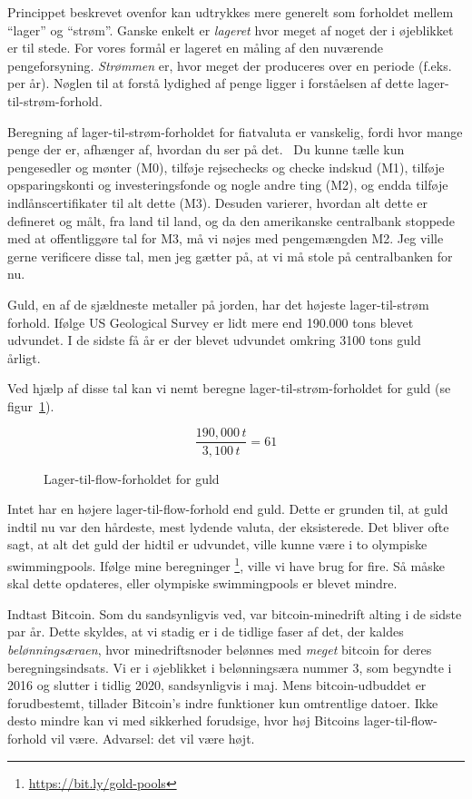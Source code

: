 Princippet beskrevet ovenfor kan udtrykkes mere generelt som
forholdet mellem \enquote{lager} og \enquote{strøm}. Ganske enkelt er 
\textit{lageret} hvor meget af noget der i øjeblikket er til stede. For vores 
formål er lageret en måling af den nuværende pengeforsyning. \textit{Strømmen} 
er, hvor meget der produceres over en periode (f.eks. per år). Nøglen til at 
forstå lydighed af penge ligger i forståelsen af dette lager-til-strøm-forhold.

Beregning af lager-til-strøm-forholdet for fiatvaluta er vanskelig, fordi hvor
mange penge der er, afhænger af, hvordan du ser på det.~\cite{wiki:money-supply} 
Du kunne tælle kun pengesedler og mønter (M0), tilføje rejsechecks og checke
indskud (M1), tilføje opsparingskonti og investeringsfonde og nogle andre ting 
(M2), og endda tilføje indlånscertifikater til alt dette (M3). Desuden 
varierer, hvordan alt dette er defineret og målt, fra land til land, og da den 
amerikanske centralbank stoppede med at offentliggøre \cite{web:fed-m3} tal 
for M3, må vi nøjes med pengemængden M2. Jeg ville gerne verificere disse
tal, men jeg gætter på, at vi må stole på centralbanken for nu.

Guld, en af de sjældneste metaller på jorden, har det højeste lager-til-strøm
forhold. Ifølge US Geological Survey er lidt mere end 190.000 tons blevet 
udvundet. I de sidste få år er der blevet udvundet omkring 3100 tons guld
årligt.~\cite{mineral-commodity-summaries}

Ved hjælp af disse tal kan vi nemt beregne lager-til-strøm-forholdet for
guld (se figur~\ref{fig:stock-to-flow-gold}).

\begin{figure}[htbp]
  \centering
  \begin{equation}
    \frac{190,000 \, t}{3,100 \, t} = 61
  \end{equation}
  \caption{Lager-til-flow-forholdet for guld}
  \label{fig:stock-to-flow-gold}
\end{figure}

Intet har en højere lager-til-flow-forhold end guld. Dette er grunden til, at 
guld indtil nu var den hårdeste, mest lydende valuta, der eksisterede. Det 
bliver ofte sagt, at alt det guld der hidtil er udvundet, ville kunne være i 
to olympiske swimmingpools. Ifølge mine beregninger
\footnote{\url{https://bit.ly/gold-pools}}, ville vi have brug for fire. Så
måske skal dette opdateres, eller olympiske swimmingpools er blevet mindre.

Indtast Bitcoin. Som du sandsynligvis ved, var bitcoin-minedrift alting i
de sidste par år. Dette skyldes, at vi stadig er i de tidlige
faser af det, der kaldes \textit{belønningsæraen}, hvor minedriftsnoder
belønnes med \textit{meget} bitcoin for deres beregningsindsats. Vi er
i øjeblikket i belønningsæra nummer 3, som begyndte i 2016 og slutter i
tidlig 2020, sandsynligvis i maj. Mens bitcoin-udbuddet er forudbestemt,
tillader Bitcoin's indre funktioner kun omtrentlige datoer.
Ikke desto mindre kan vi med sikkerhed forudsige, hvor høj Bitcoins
lager-til-flow-forhold vil være. Advarsel: det vil være højt.

